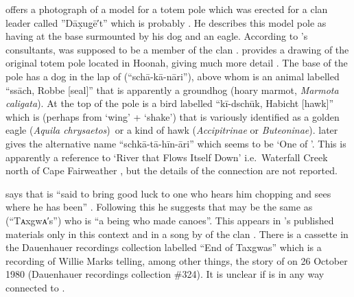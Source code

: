 \citeauthor{swanton:1908} offers a photograph of a model for a totem pole which was erected for a  clan leader called ”Dāx̣ug̣ē′t” which is probably  \parencite[431 fig.\ 109]{swanton:1908}.
He describes this model pole as having  at the base surmounted by his dog and an eagle.
According to \citeauthor{swanton:1908}’s consultants,  was supposed to be a member of the  clan \parencite[432]{swanton:1908}.
\citeauthor{krause:1885} provides a drawing of the original totem pole located in Hoonah, giving much more detail \parencites[132]{krause:1885}[94]{krause:1956}.
The base of the pole has a dog in the lap of  (“schā-kā-nāri”), above whom is an animal labelled “ssāch, Robbe [seal]” that is apparently a groundhog  (hoary marmot, \textit{Marmota caligata}).
At the top of the pole is a bird labelled “kī-dschūk, Habicht [hawk]” which is  (perhaps from  ‘wing’ +  ‘shake’) that is variously identified as a golden eagle (\textit{Aquila chrysaetos})\ or a kind of hawk (\textit{Accipitrinae} or \textit{Buteoninae}).
\citeauthor{krause:1885} later gives the alternative name “schkā-tā-hīn-āri” \parencites[380]{krause:1885}[251]{krause:1956} which seems to be  ‘One of ’.
This is apparently a reference to  ‘River that Flows Itself Down’ i.e.\ Waterfall Creek north of Cape Fairweather \parencite[25 \#289, 40 \#31]{thornton:2012}, but the details of the connection are not reported.

\citeauthor{swanton:1908} says that  is “said to bring good luck to one who hears him chopping and sees where he has been” \parencite[460]{swanton:1908}.
Following this he suggests that  may be the same as  (“Tᴀxgwᴀ′s”) who is “a being who made canoes”.
This  appears in \citeauthor{swanton:1908}’s published materials only in this context and in a song by  of the  clan \parencite[410–411 \#82]{swanton:1909}.
There is a cassette in the Dauenhauer recordings collection labelled “End of Taxgwas” which is a recording of  Willie Marks telling, among other things, the story of  on 26 October 1980 (Dauenhauer recordings collection \#324).
It is unclear if  is in any way connected to .


